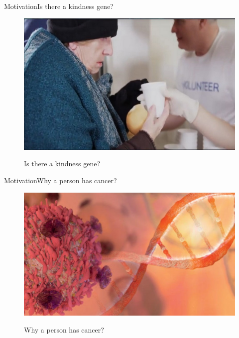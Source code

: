 \documentclass[10pt]{beamer}
\begin{document}
{%
\begin{frame}{Motivation}{Is there a kindness gene?
}
\begin{figure}[]
 \centering
    \includegraphics[width=\textwidth,height=0.7\textheight,keepaspectratio]{img/introduction/mot2.jpg}
    \label{img:mot2}
    \caption{Is there a kindness gene?}
\end{figure}
\end{frame}

\begin{frame}{Motivation}{Why a person has cancer?}
\begin{figure}[]
 \centering
    \includegraphics[width=\textwidth,height=0.6\textheight,keepaspectratio]{img/introduction/mot3.jpg}
    \label{img:mot2}
    \caption{Why a person has cancer?}
\end{figure}
\end{frame}

}
\end{document}
